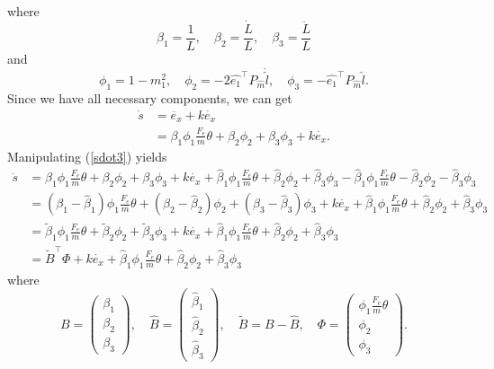 where
\begin{equation}
\beta_1=\frac{1}{L},\quad \beta_2=\frac{\dot{L}}{L}, \quad \beta_3=\frac{\ddot{L}}{L}
\end{equation}
and
\begin{equation}
\phi_1=1-m_1^2,\quad \phi_2=-2\hat{e_1}^{\top}P_{\hat{m}}\dot{\hat{l}}, \quad \phi_3=-\hat{e_1}^{\top}P_{\hat{m}}\hat{l}.
\end{equation}
Since we have all necessary components, we can get 
\begin{align}
\dot{s}&=\ddot{e_x}+k\dot{e_x}
\\&=\beta_1\phi_1\frac{F_e}{m}\theta+\beta_2\phi_2+\beta_3\phi_3+k\dot{e_x}.
\label{sdot3}
\end{align}
Manipulating (\ref{sdot3}) yields
\begin{align}
\dot{s}&=\beta_1\phi_1\frac{F_e}{m}\theta+\beta_2\phi_2+\beta_3\phi_3+k\dot{e_x}+\hat{\beta}_1\phi_1\frac{F_e}{m}\theta+\hat{\beta}_2\phi_2+\hat{\beta}_3\phi_3-\hat{\beta}_1\phi_1\frac{F_e}{m}\theta-\hat{\beta}_2\phi_2-\hat{\beta}_3\phi_3
\\&=(\beta_1-\hat{\beta}_1)\phi_1\frac{F_e}{m}\theta+(\beta_2-\hat{\beta}_2)\phi_2+(\beta_3-\hat{\beta}_3)\phi_3+k\dot{e_x}+\hat{\beta}_1\phi_1\frac{F_e}{m}\theta+\hat{\beta}_2\phi_2+\hat{\beta}_3\phi_3
\\&=\tilde{\beta}_1\phi_1\frac{F_e}{m}\theta+\tilde{\beta}_2\phi_2+\tilde{\beta}_3\phi_3+k\dot{e_x}+\hat{\beta}_1\phi_1\frac{F_e}{m}\theta+\hat{\beta}_2\phi_2+\hat{\beta}_3\phi_3
\\&=\tilde{B}^\top\Phi+k\dot{e_x}+\hat{\beta}_1\phi_1\frac{F_e}{m}\theta+\hat{\beta}_2\phi_2+\hat{\beta}_3\phi_3
\end{align}
where 
\begin{equation}
B=\begin{pmatrix}
\beta_1 \\ \beta_2 \\ \beta_3
\end{pmatrix}, \quad
\hat{B}=\begin{pmatrix} \hat{\beta}_1 \\ \hat{\beta}_2 \\ \hat{\beta}_3 \end{pmatrix}, \quad
\tilde{B}=B-\hat{B}, \quad 
\Phi=\begin{pmatrix} \phi_1\frac{F_e}{m}\theta \\ \phi_2 \\ \phi_3 \end{pmatrix}.
\end{equation}
